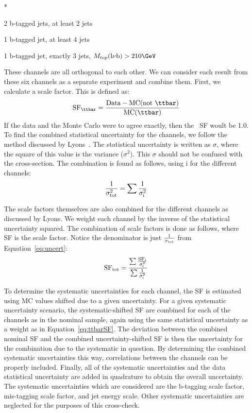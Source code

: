 \begin{list} {*} {}
\item 2 b-tagged jets, at least 2 jets
\item 1 b-tagged jet, at least 4 jets
\item 1 b-tagged jet, exactly 3  jets, $M_{top}(\rm l\nu b)>210\GeV$
\end{list}

These channels are all orthogonal to each other.  We can consider each result from these six channels as a separate experiment and combine them.  First, we calculate a scale factor.  This is defined as:
\begin{equation} \rm SF_{\ttbar} = \frac{Data - MC(not~\ttbar)}{MC(\ttbar)} 
\end{equation}
If the data and the Monte Carlo were to agree exactly, then the \ttbar~SF woult be 1.0.  To find the combined statistical uncertainty for the channels, we follow the method discussed by Lyons~\cite{Lyons, Lyonspaper}.  The statistical uncertainty is written as $\sigma$, where the square of this value is the variance ($\sigma^2$).  This $\sigma$ should not be confused with the cross-section.  The combination is found as follows, using i for the different channels:
\begin{equation} \rm \frac{1}{\sigma_{tot}^2} = \sum \frac{1}{\sigma_i^2} 
\label{eq:uncert}
\end{equation}

The scale factors themselves are also combined for the different channels as discussed by Lyons.  We weight each channel by the inverse of the statistical uncertainty squared.  The combination of scale factors is done as follows, where SF is the scale factor.  Notice the denominator is just $\rm \frac{1}{\sigma_{tot}}$ from Equation~\ref{eq:uncert}:
\begin{equation} \rm SF_{tot} = \frac{\sum \frac{SF_i}{\sigma_i^2}}{\sum \frac{1}{\sigma_i^2}}
\label{eq:ttbarSF}
\end{equation}

To determine the systematic uncertainties for each channel, the SF is estimated using MC values shifted due to a given uncertainty.  For a given systematic uncertainty scenario, the systematic-shifted SF are combined for each of the channels as in the nominal sample, again using the same statistical uncertainty as a weight as in Equation~\ref{eq:ttbarSF}.  The deviation between the combined nominal SF and the combined uncertainty-shifted SF is then the uncertainty for the combination due to the systematic in question.  By determining the combined systematic uncertainties this way, correlations between the channels can be properly included.  Finally, all of the systematic uncertainties and the data statistical uncertainty are added in quadrature to obtain the overall uncertainty.  The systematic uncertainties which are considered are the b-tagging scale factor, mis-tagging scale factor, and jet energy scale.  Other systematic uncertainties are neglected for the purposes of this cross-check.  

